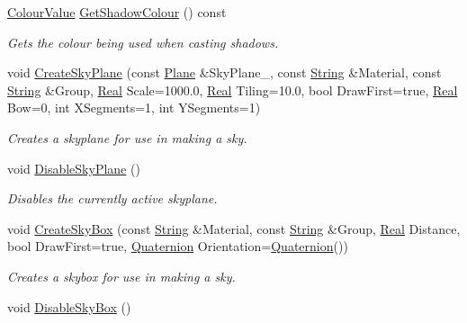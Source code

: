\begin{DoxyCompactItemize}
\hyperlink{classphys_1_1ColourValue}{ColourValue} \hyperlink{classphys_1_1SceneManager_ab008f05d80ca7e8fa7df3ab4e621173f}{GetShadowColour} () const 
\begin{DoxyCompactList}\small\item\em Gets the colour being used when casting shadows. \item\end{DoxyCompactList}\item 
void \hyperlink{classphys_1_1SceneManager_a5593ec052782189f77ef27a10272da8f}{CreateSkyPlane} (const \hyperlink{classphys_1_1Plane}{Plane} \&SkyPlane\_\-, const \hyperlink{namespacephys_aa03900411993de7fbfec4789bc1d392e}{String} \&Material, const \hyperlink{namespacephys_aa03900411993de7fbfec4789bc1d392e}{String} \&Group, \hyperlink{namespacephys_af7eb897198d265b8e868f45240230d5f}{Real} Scale=1000.0, \hyperlink{namespacephys_af7eb897198d265b8e868f45240230d5f}{Real} Tiling=10.0, bool DrawFirst=true, \hyperlink{namespacephys_af7eb897198d265b8e868f45240230d5f}{Real} Bow=0, int XSegments=1, int YSegments=1)
\begin{DoxyCompactList}\small\item\em Creates a skyplane for use in making a sky. \item\end{DoxyCompactList}\item 
void \hyperlink{classphys_1_1SceneManager_af5763eedafdd11712b55ee33a11bd2b8}{DisableSkyPlane} ()
\begin{DoxyCompactList}\small\item\em Disables the currently active skyplane. \item\end{DoxyCompactList}\item 
void \hyperlink{classphys_1_1SceneManager_a24e2699227790a0431613e49f3b68db0}{CreateSkyBox} (const \hyperlink{namespacephys_aa03900411993de7fbfec4789bc1d392e}{String} \&Material, const \hyperlink{namespacephys_aa03900411993de7fbfec4789bc1d392e}{String} \&Group, \hyperlink{namespacephys_af7eb897198d265b8e868f45240230d5f}{Real} Distance, bool DrawFirst=true, \hyperlink{classphys_1_1Quaternion}{Quaternion} Orientation=\hyperlink{classphys_1_1Quaternion}{Quaternion}())
\begin{DoxyCompactList}\small\item\em Creates a skybox for use in making a sky. \item\end{DoxyCompactList}\item 
void \hyperlink{classphys_1_1SceneManager_acb9c87d510955f028db24ce49944a97a}{DisableSkyBox} ()

\end{DoxyCompactItemize}
